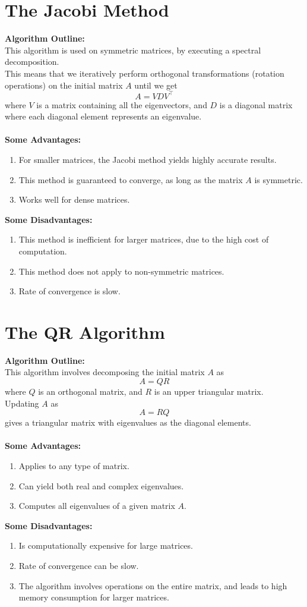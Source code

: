 \documentclass[journal,12pt,twocolumn]{IEEEtran}
\theoremstyle{remark}
\begin{document}
\section{The Jacobi Method}
\textbf{Algorithm Outline:}
\\
This algorithm is used on symmetric matrices, by executing a spectral decomposition. \\
This means that we iteratively perform orthogonal transformations (rotation operations) on the initial matrix $A$ until we get $$A = VDV^\top$$ where $V$ is a matrix containing all the eigenvectors, and $D$ is a diagonal matrix where each diagonal element represents an eigenvalue.
\\ \\
\textbf{Some Advantages:}
\begin{enumerate}
\item For smaller matrices, the Jacobi method yields highly accurate results. 
\item This method is guaranteed to converge, as long as the matrix $A$ is symmetric.
\item Works well for dense matrices.
\end{enumerate}
\textbf{Some Disadvantages:}
\begin{enumerate}
\item This method is inefficient for larger matrices, due to the high cost of computation.
\item This method does not apply to non-symmetric matrices.
\item Rate of convergence is slow.
\end{enumerate}

\section{The QR Algorithm}
\textbf{Algorithm Outline:}
\\
This algorithm involves decomposing the initial matrix $A$ as $$A=QR$$ where $Q$ is an orthogonal matrix, and $R$ is an upper triangular matrix. \\
Updating $A$ as $$A=RQ$$ gives a triangular matrix with eigenvalues as the diagonal elements.
\\ \\
\textbf{Some Advantages:}
\begin{enumerate}
\item Applies to any type of matrix.
\item Can yield both real and complex eigenvalues.
\item Computes all eigenvalues of a given matrix $A$.
\end{enumerate}
\textbf{Some Disadvantages:}
\begin{enumerate}
\item Is computationally expensive for large matrices.
\item Rate of convergence can be slow.
\item The algorithm involves operations on the entire matrix, and leads to high memory consumption for larger matrices.
\end{enumerate}
\end{document}
